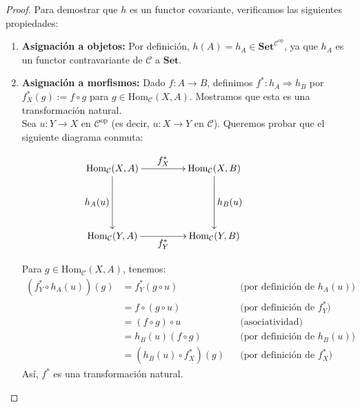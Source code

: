  
 \begin{proposicion}
 \end{proposicion}
 
 
 
 
 \begin{proof}
 	Para demostrar que $h$ es un functor covariante, verificamos las siguientes propiedades:
 	\begin{enumerate}
 		
 		\item \textbf{Asignación a objetos:} Por definición, \( h(A) = h_A \in \mathbf{Set}^{\mathcal{C}^{\mathrm{op}}} \), ya que \( h_A \) es un functor contravariante de \( \mathcal{C} \) a \( \mathbf{Set} \).
 		
 		\item \textbf{Asignación a morfismos:} Dado \( f: A \to B \), definimos \( f^\ast: h_A \Longrightarrow h_B \) por \( f^\ast_X(g) := f \circ g \) para \( g \in \mathrm{Hom}_\mathcal{C}(X, A) \). Mostramos que esta es una transformación natural.\\
 		
 		\noindent Sea \( u: Y \to X \) en \( \mathcal{C}^{\mathrm{op}} \) (es decir, \( u: X \to Y \) en \( \mathcal{C} \)). Queremos probar que el siguiente diagrama conmuta:
 		
 		\[
 		\xymatrix @C=4.5em{
 			\mathrm{Hom}_\mathcal{C}(X, A) \ar[r]^{\displaystyle f^\ast_X} \ar[dd]_{\displaystyle h_A(u)} & \mathrm{Hom}_\mathcal{C}(X, B) \ar[dd]^{ \displaystyle h_B(u)} \\
 			&&\\
 			\mathrm{Hom}_\mathcal{C}(Y, A) \ar[r]_{ \displaystyle f^\ast_Y} & \mathrm{Hom}_\mathcal{C}(Y, B)
 		}
 		\]
 		
 		Para \( g \in \mathrm{Hom}_\mathcal{C}(X, A) \), tenemos:
 		\begin{align*}
 			(f^\ast_Y \circ h_A(u))(g) &= f^\ast_Y(g \circ u) && \text{(por definición de } h_A(u)\text{)} \\
 			&= f \circ (g \circ u) && \text{(por definición de } f^\ast_Y\text{)} \\
 			&= (f \circ g) \circ u && \text{(asociatividad)} \\
 			&= h_B(u)(f \circ g) && \text{(por definición de } h_B(u)\text{)} \\
 			&= (h_B(u) \circ f^\ast_X)(g) && \text{(por definición de } f^\ast_X\text{)}
 		\end{align*}
 		Así, \( f^\ast \) es una transformación natural.
 		

\end{enumerate}
\end{proof}
